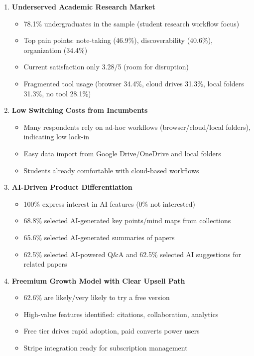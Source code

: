 \begin{enumerate}
    \item \textbf{Underserved Academic Research Market}
          \begin{itemize}
              \item 78.1\% undergraduates in the sample (student research workflow focus)
              \item Top pain points: note-taking (46.9\%), discoverability (40.6\%), organization (34.4\%)
              \item Current satisfaction only 3.28/5 (room for disruption)
              \item Fragmented tool usage (browser 34.4\%, cloud drives 31.3\%, local folders 31.3\%, no tool 28.1\%)
          \end{itemize}

    \item \textbf{Low Switching Costs from Incumbents}
          \begin{itemize}
              \item Many respondents rely on ad-hoc workflows (browser/cloud/local folders), indicating low lock-in
              \item Easy data import from Google Drive/OneDrive and local folders
              \item Students already comfortable with cloud-based workflows
          \end{itemize}

    \item \textbf{AI-Driven Product Differentiation}
          \begin{itemize}
              \item 100\% express interest in AI features (0\% not interested)
              \item 68.8\% selected AI-generated key points/mind maps from collections
              \item 65.6\% selected AI-generated summaries of papers
              \item 62.5\% selected AI-powered Q\&A and 62.5\% selected AI suggestions for related papers
          \end{itemize}

    \item \textbf{Freemium Growth Model with Clear Upsell Path}
          \begin{itemize}
              \item 62.6\% are likely/very likely to try a free version
              \item High-value features identified: citations, collaboration, analytics
              \item Free tier drives rapid adoption, paid converts power users
              \item Stripe integration ready for subscription management
          \end{itemize}


\end{enumerate}

